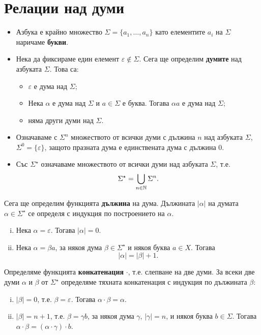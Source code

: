 \section{Релации над думи}

\begin{itemize}
\item
  Азбука е крайно множество $\Sigma = \{a_1,\dots,a_n\}$ като елементите $a_i$ на $\Sigma$ наричаме {\bf букви}.
\item
  Нека да фиксираме един елемент $\varepsilon \not\in \Sigma$.
  Сега ще определим {\bf думите} над азбуката $\Sigma$. Това са:
  \begin{itemize}
  \item
    $\varepsilon$ е дума над $\Sigma$;
  \item
    Нека $\alpha$ е дума над $\Sigma$ и $a \in \Sigma$ е буква.
    Тогава $\alpha a$ е дума над $\Sigma$;
  \item
    няма други думи над $\Sigma$.
  \end{itemize}
\item
  Означаваме с $\Sigma^n$ множеството от всички думи с дължина $n$ над азбуката $\Sigma$, $\Sigma^0 = \{\varepsilon\}$,
  защото празната дума е единствената дума с дължина $0$.
\item
  Със $\Sigma^\star$ означаваме множеството от всички думи над азбуката $\Sigma$, т.е.
  \marginpar{$0 \in \Nat$}
  \[\Sigma^\star = \bigcup_{n\in\mathbb{N}} \Sigma^{n}.\]
\end{itemize}

Сега ще определим функцията {\bf дължина} на дума.
Дължината $|\alpha|$ на думата $\alpha \in \Sigma^\star$ се определя с индукция по построението на $\alpha$.
\begin{enumerate}[(i)]
  \item
    Нека $\alpha = \varepsilon$. Тогава $|\alpha| = 0$.
  \item
    Нека $\alpha = \beta a$, за някоя дума $\beta\in \Sigma^\star$ и някоя буква $a\in X$.
    Тогава \[|\alpha| = |\beta| + 1.\]
\end{enumerate}

Определяме функцията {\bf конкатенация} $\cdot$, т.е.
слепване на две думи.
За всеки две думи $\alpha$ и $\beta$ от $\Sigma^\star$ определяме тяхната конкатенация с индукция по дължината $\beta$:
\begin{enumerate}[(i)]
  \item
    $|\beta| = 0$, т.е. $\beta = \varepsilon$.
    Тогава $\alpha\cdot\beta = \alpha$.
  \item
    $|\beta| = n+1$, т.е. $\beta = \gamma b$, за някоя дума $\gamma$, $|\gamma| = n$, и някоя буква $b\in\Sigma$.
    Тогава $\alpha\cdot\beta = (\alpha\cdot\gamma)\cdot b$.
\end{enumerate}

